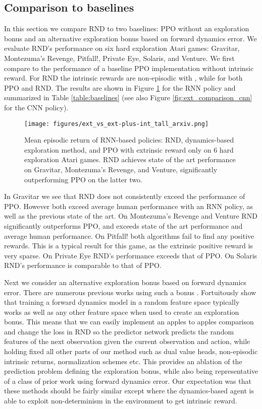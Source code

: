 \documentclass{article} \usepackage[dvipsnames]{xcolor}
\begin{document}
\subsection{Comparison to baselines}
\label{sec:baselines}
In this section we compare RND to two baselines: PPO without an exploration bonus and an alternative exploration bonus based on forward dynamics error. We evaluate RND's performance on six hard exploration Atari games: Gravitar, Montezuma's Revenge, Pitfall!, Private Eye, Solaris, and Venture. We first compare to the performance of a baseline PPO implementation without intrinsic reward. For RND the intrinsic rewards are non-episodic with  , while  for both PPO and RND. The results are shown in Figure \ref{fig:ext_comparison} for the RNN policy and summarized in Table \ref{table:baselines} (see also Figure \ref{fig:ext_comparison_cnn} for the CNN policy).

\begin{figure}[h!]
\centering
\texttt{[image: figures/ext\_vs\_ext-plus-int\_tall\_arxiv.png]}
\caption{Mean episodic return of RNN-based policies: RND, dynamics-based exploration method, and PPO with extrinsic reward only on 6 hard exploration Atari games. RND achieves state of the art performance on Gravitar, Montezuma's Revenge, and Venture, significantly outperforming PPO on the latter two.}
\label{fig:ext_comparison}
\vspace*{-8pt}
\end{figure}

In Gravitar we see that RND does not consistently exceed the performance of PPO. However both exceed average human performance with an RNN policy, as well as the previous state of the art. On Montezuma's Revenge and Venture RND significantly outperforms PPO, and exceeds state of the art performance and average human performance. On Pitfall! both algorithms fail to find any positive rewards. This is a typical result for this game, as the extrinsic positive reward is very sparse. On Private Eye RND's performance exceeds that of PPO. On Solaris RND's performance is comparable to that of PPO. 

Next we consider an alternative exploration bonus based on forward dynamics error. There are numerous previous works using such a bonus \citep{schmidhuber_curiosity,stadie2015incentivizing,josh_surprise,pathakICMl17curiosity,burda18largescale}. Fortuitously \citet{burda18largescale} show that training a forward dynamics model in a random feature space typically works as well as any other feature space when used to create an exploration bonus. This means that we can easily implement an apples to apples comparison and change the loss in RND so the predictor network predicts the random features of the next observation given the current observation and action, while holding fixed all other parts of our method such as dual value heads, non-episodic intrinsic returns, normalization schemes etc. This provides an ablation of the prediction problem defining the exploration bonus, while also being representative of a class of prior work using forward dynamics error. Our expectation was that these methods should be fairly similar except where the dynamics-based agent is able to exploit non-determinism in the environment to get intrinsic reward.
\end{document}
